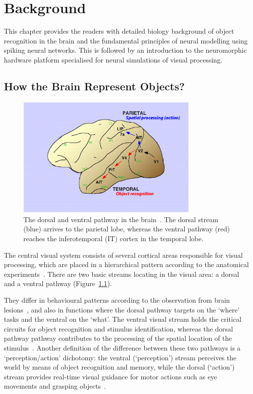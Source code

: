 \chapter{Background}
\label{cha:bkg}
This chapter provides the readers with detailed biology background of object recognition in the brain and the fundamental principles of neural modelling using spiking neural networks.
This is followed by an introduction to the neuromorphic hardware platform specialised for neural simulations of visual processing.

\section{How the Brain Represent Objects?}
\label{sec:bio}

\begin{figure}
	\centering
	\includegraphics[width=0.8\textwidth]{pics/twoPaths.jpg}
	\caption{The dorsal and ventral pathway in the brain~\cite{lehky2007comparison}.
	The dorsal stream (blue) arrives to the parietal lobe, whereas the ventral pathway (red) reaches the inferotemporal (IT) cortex in the temporal lobe.}
	\label{Fig:TwoPath}
\end{figure}
The central visual system consists of several cortical areas responsible for visual processing, which are placed in a hierarchical pattern according to the anatomical experiments~\cite{felleman1991distributed}.
There are two basic streams locating in the visual area: a dorsal and a ventral pathway (Figure~\ref{Fig:TwoPath}).

They differ in behavioural patterns according to the observation from brain lesions~\cite{prado2005two}, and also in functions where the dorsal pathway targets on the `where' tasks and the ventral on the `what'.
The ventral visual stream holds the critical circuits for object recognition and stimulus identification, whereas the dorsal pathway pathway contributes to the processing of the spatial location of the stimulus~\cite{prado2005two, Ungerleider1994157}.
Another definition of the difference between these two pathways is a `perception/action' dichotomy: the ventral (`perception') stream perceives the world by means of object recognition and memory, while the dorsal (`action') stream provides real-time visual guidance for motor actions such as eye movements and grasping objects~\cite{goodale1992separate}. 

